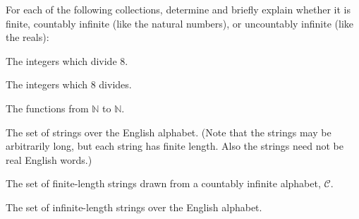 \documentclass[11pt]{article}
\begin{document}

For each of the following collections, determine and briefly explain whether it is finite, countably infinite (like the natural numbers), or uncountably infinite (like the reals):

\begin{Parts}





\Part The integers which divide $8$.


\Part The integers which $8$ divides.


\Part The functions from $\mathbb{N}$ to $\mathbb{N}$.


\Part The set of strings over the English alphabet. (Note that the strings may be arbitrarily long, but each string has finite length. Also the strings need not be real English words.)





\Part The set of finite-length strings drawn from a countably infinite alphabet, $\mathcal{C}$.

\Part The set of infinite-length strings over the English alphabet.

\end{Parts}
\end{document}
